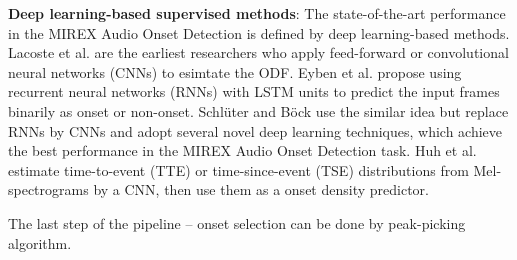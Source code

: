 \noindent\textbf{Deep learning-based supervised methods}: The state-of-the-art performance in the MIREX Audio Onset Detection is defined by deep learning-based methods. Lacoste et al.  are the earliest researchers who apply feed-forward or convolutional neural networks (CNNs) to esimtate the ODF. Eyben et al.  propose using recurrent neural networks (RNNs) with LSTM units to predict the input frames binarily as onset or non-onset. Schlüter and Böck  use the similar idea but replace RNNs by CNNs and adopt several novel deep learning techniques, which achieve the best performance in the MIREX Audio Onset Detection task. Huh et al.  estimate time-to-event (TTE) or time-since-event (TSE) distributions from Mel-spectrograms by a CNN, then use them as a onset density predictor.

The last step of the pipeline -- onset selection can be done by peak-picking  algorithm.

